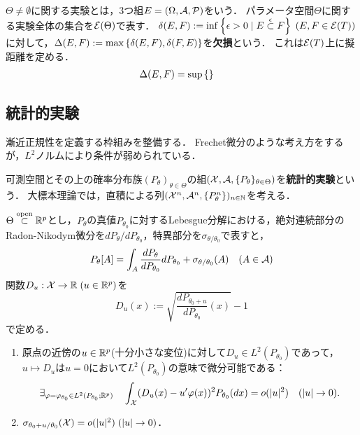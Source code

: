 \documentclass[uplatex,dvipdfmx]{jsreport}
\begin{document}
\begin{definition}
    $\Theta\ne\emptyset$に関する実験とは，3つ組$E=(\Omega,\mathcal{A},\mathcal{P})$をいう．
    パラメータ空間$\Theta$に関する実験全体の集合を$\mathcal{E}(\Theta)$で表す．
    $\delta(E,F):=\inf\left\{\epsilon>0\mid E\overset{\epsilon}{\subset} F\right\}\;(E,F\in\mathcal{E}(T))$に対して，$\Delta(E,F):=\max\left\{\delta(E,F),\delta(F,E)\right\}$を\textbf{欠損}という．
    これは$\mathcal{E}(T)$上に擬距離を定める．
    \begin{align*}
        \Delta(E,F)&=\sup\left\{\right\}
    \end{align*}
\end{definition}

\subsection{統計的実験}

\begin{tcolorbox}[colframe=ForestGreen, colback=ForestGreen!10!white,breakable,colbacktitle=ForestGreen!40!white,coltitle=black,fonttitle=\bfseries\sffamily,
title=]
    漸近正規性を定義する枠組みを整備する．
    Frechet微分のような考え方をするが，$L^2$ノルムにより条件が弱められている\cite{Ibragimov HasMinskii}．
\end{tcolorbox}

\begin{definition}
    可測空間とその上の確率分布族$(P_\theta)_{\theta\in\Theta}$の組$(\mathcal{X},\mathcal{A},\{P_\theta\}_{\theta\in\Theta})$を\textbf{統計的実験}という．
    大標本理論では，直積による列$(\mathcal{X}^n,\mathcal{A}^n,\{P_\theta^n\})_{n\in\mathbb{N}}$を考える．
\end{definition}

\begin{notation}[正則性の仮定]
    $\Theta\overset{\mathrm{open}}{\subset}\mathbb{R}^p$とし，$P_\theta$の真値$P_{\theta_0}$に対するLebesgue分解における，絶対連続部分のRadon-Nikodym微分を$dP_\theta/dP_{\theta_0}$，特異部分を$\sigma_{\theta/\theta_0}$で表すと，
    \[P_\theta[A]=\int_A\frac{dP_\theta}{dP_{\theta_0}}dP_{\theta_0}+\sigma_{\theta/\theta_0}(A)\quad(A\in\mathcal{A})\]
    関数$D_u:\mathcal{X}\to\mathbb{R}\;(u\in\mathbb{R}^p)$を
    \[D_u(x):=\sqrt{\frac{dP_{\theta_0+u}}{dP_{\theta_0}}(x)}-1\]
    で定める．
\end{notation}

\begin{enumerate}[({G}1)]
    \item 原点の近傍の$u\in\mathbb{R}^p$(十分小さな変位)に対して$D_u\in L^2(P_{\theta_0})$であって，$u\mapsto D_u$は$u=0$において$L^2(P_{\theta_0})$の意味で微分可能である：
    \[\exists_{\varphi=\varphi_{\theta_0}\in L^2(P_{\theta_0};\mathbb{R}^p)}\quad\int_{\mathcal{X}}(D_u(x)-u'\varphi(x))^2P_{\theta_0}(dx)=o(\lvert u\rvert^2)\quad(\lvert u\rvert\to0).\]
    \item $\sigma_{\theta_0+u/\theta_0}(\mathcal{X})=o(\lvert u\rvert^2)\;(\lvert u\rvert\to0)$．
\end{enumerate}
\end{document}
